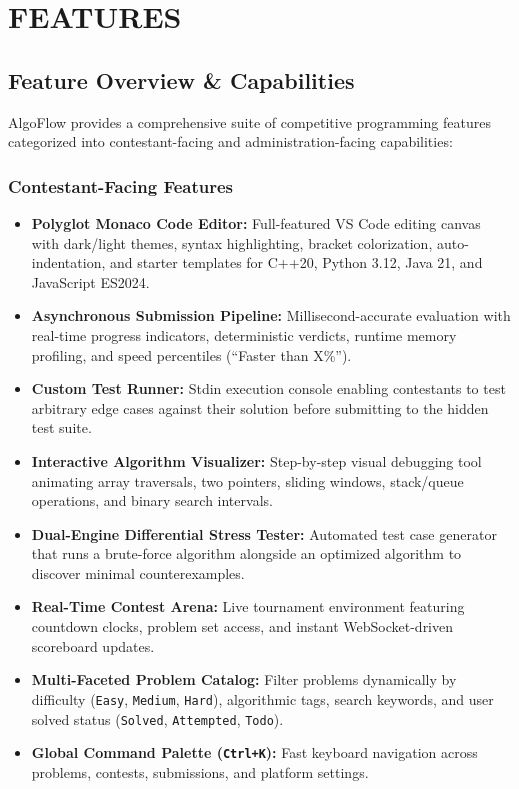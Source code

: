 \documentclass[12pt,a4paper]{report}
\begin{document}
\chapter{FEATURES}

\section{Feature Overview \& Capabilities}
AlgoFlow provides a comprehensive suite of competitive programming features categorized into contestant-facing and administration-facing capabilities:

\subsection{Contestant-Facing Features}
\begin{itemize}[leftmargin=*]
  \item \textbf{Polyglot Monaco Code Editor:} Full-featured VS Code editing canvas with dark/light themes, syntax highlighting, bracket colorization, auto-indentation, and starter templates for C++20, Python 3.12, Java 21, and JavaScript ES2024.
  \item \textbf{Asynchronous Submission Pipeline:} Millisecond-accurate evaluation with real-time progress indicators, deterministic verdicts, runtime memory profiling, and speed percentiles (``Faster than X\%'').
  \item \textbf{Custom Test Runner:} Stdin execution console enabling contestants to test arbitrary edge cases against their solution before submitting to the hidden test suite.
  \item \textbf{Interactive Algorithm Visualizer:} Step-by-step visual debugging tool animating array traversals, two pointers, sliding windows, stack/queue operations, and binary search intervals.
  \item \textbf{Dual-Engine Differential Stress Tester:} Automated test case generator that runs a brute-force algorithm alongside an optimized algorithm to discover minimal counterexamples.
  \item \textbf{Real-Time Contest Arena:} Live tournament environment featuring countdown clocks, problem set access, and instant WebSocket-driven scoreboard updates.
  \item \textbf{Multi-Faceted Problem Catalog:} Filter problems dynamically by difficulty (\texttt{Easy}, \texttt{Medium}, \texttt{Hard}), algorithmic tags, search keywords, and user solved status (\texttt{Solved}, \texttt{Attempted}, \texttt{Todo}).
  \item \textbf{Global Command Palette (\texttt{Ctrl+K}):} Fast keyboard navigation across problems, contests, submissions, and platform settings.
\end{itemize}
\end{document}

